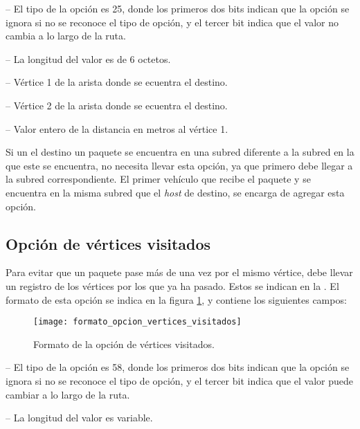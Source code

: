  -- El tipo de la opción es 25, donde los primeros dos
bits indican que la opción se ignora si no se reconoce el tipo de opción, y el
tercer bit indica que el valor no cambia a lo largo de la ruta.

 -- La longitud del valor es de 6 octetos.

 -- Vértice 1 de la arista donde se ecuentra el
destino.

 -- Vértice 2 de la arista donde se ecuentra el
destino.

 -- Valor entero de la distancia en metros al
vértice 1.

Si un el destino un paquete se encuentra en una subred diferente a la subred en
la que este se encuentra, no necesita llevar esta opción, ya que primero debe
llegar a la subred correspondiente. El primer vehículo que recibe el paquete y
se encuentra en la misma subred que el \textit{host} de destino, se encarga de
agregar esta opción.

\subsection{Opción de vértices visitados}
\label{subsec:opcion_de_vertices_visitados}

Para evitar que un paquete pase más de una vez por el mismo vértice, debe
llevar un registro de los vértices por los que ya ha pasado. Estos se indican en
la . El formato de esta opción se indica
en la figura \ref{fig:formato_opcion_vertices_visitados}, y contiene los
siguientes campos:

\begin{figure}[th!]
\centering
\texttt{[image: formato\_opcion\_vertices\_visitados]}
\decoRule
\caption[Formato de la opción de vértices visitados]{Formato de la opción de
vértices visitados.}
\label{fig:formato_opcion_vertices_visitados}
\end{figure}

 -- El tipo de la opción es 58, donde los primeros dos
bits indican que la opción se ignora si no se reconoce el tipo de opción, y el
tercer bit indica que el valor puede cambiar a lo largo de la ruta.

 -- La longitud del valor es variable.

